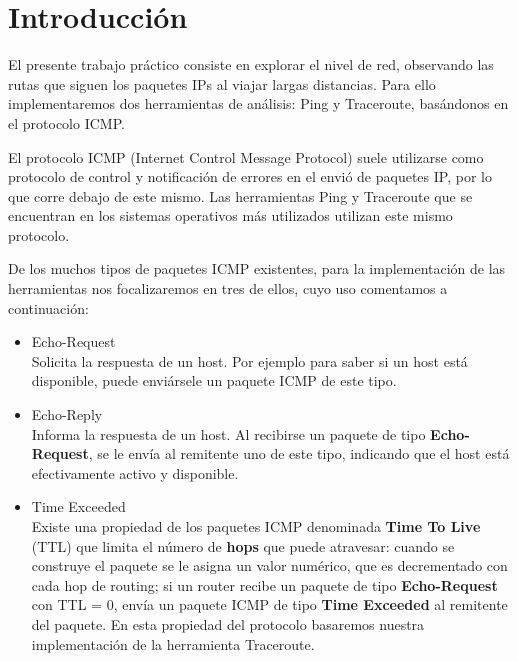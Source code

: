 
\section{Introducci\'on}

El presente trabajo pr\'actico consiste en explorar el nivel de red, observando las rutas que siguen los paquetes IPs al viajar largas distancias. Para ello implementaremos dos herramientas de análisis: Ping y Traceroute,  basándonos en el protocolo ICMP.

El protocolo ICMP (Internet Control Message Protocol) suele utilizarse como protocolo de control y notificaci\'on de errores en el envi\'o de paquetes IP, por lo que corre debajo de este mismo. Las herramientas Ping y Traceroute que se encuentran en los sistemas operativos más utilizados utilizan este mismo protocolo.

De los muchos tipos de paquetes ICMP existentes, para la implementaci\'on de las herramientas nos focalizaremos en tres de ellos, cuyo uso comentamos a continuación:

\begin{itemize}
 \item Echo-Request \\ 
 Solicita la respuesta de un host. Por ejemplo para saber si un host está disponible, puede enviársele un paquete ICMP de este tipo.
 \item Echo-Reply \\
 Informa la respuesta de un host. Al recibirse un paquete de tipo {\bf Echo-Request}, se le envía al remitente uno de este tipo, indicando que el host está efectivamente activo y disponible.
 \item Time Exceeded \\
 Existe una propiedad de los paquetes ICMP denominada {\bf Time To Live} (TTL) que limita el número de {\bf hops} que puede atravesar: cuando se construye el paquete se le asigna un valor numérico, que es decrementado con cada hop de routing; si un router recibe un paquete de tipo {\bf Echo-Request} con TTL = 0, envía un paquete ICMP de tipo {\bf Time Exceeded} al remitente del paquete. En esta propiedad del protocolo basaremos nuestra implementación de la herramienta Traceroute.
\end{itemize}


